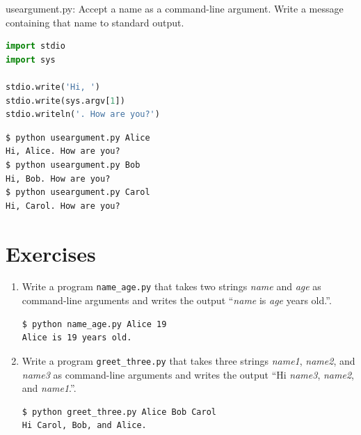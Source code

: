 \documentclass[8pt,a4paper,compress]{beamer}
\begin{document}
\begin{frame}[fragile]
\begin{framed}
\tiny useargument.py: Accept a name as a command-line argument. Write a message containing that name to standard output.
\end{framed}

\begin{lstlisting}[language=Python]
import stdio
import sys

stdio.write('Hi, ')
stdio.write(sys.argv[1])
stdio.writeln('. How are you?')
\end{lstlisting}

\begin{lstlisting}[language={}]
$ python useargument.py Alice
Hi, Alice. How are you?
$ python useargument.py Bob
Hi, Bob. How are you?
$ python useargument.py Carol
Hi, Carol. How are you?
\end{lstlisting}
\end{frame}

\section{Exercises}
\begin{frame}[fragile]
\begin{enumerate}
\item Write a program \lstinline{name_age.py} that takes two strings \emph{name} and \emph{age} as command-line arguments and writes the output ``\emph{name} is \emph{age} years old.''.
\begin{lstlisting}[language={}]
$ python name_age.py Alice 19
Alice is 19 years old.
\end{lstlisting}

\item Write a program \lstinline{greet_three.py} that takes three strings \emph{name1}, \emph{name2}, and \emph{name3} as command-line arguments and writes the output ``Hi \emph{name3}, \emph{name2}, and \emph{name1}.''.
\begin{lstlisting}[language={}]
$ python greet_three.py Alice Bob Carol
Hi Carol, Bob, and Alice.
\end{lstlisting}
\end{enumerate}
\end{frame}
\end{document}
